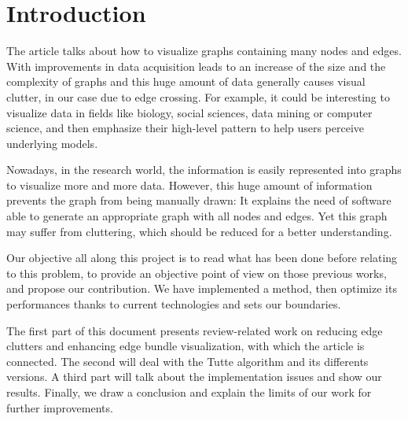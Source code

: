\chapter*{Introduction}

The article talks about how to visualize graphs containing many nodes and edges. With improvements in data acquisition leads to an increase of the size and the complexity of graphs and this huge amount of data generally causes visual clutter, in our case due to edge crossing.
For example, it could be interesting to visualize data in fields like biology, social sciences, data mining or computer science, and then emphasize their high-level pattern to help users perceive underlying models.


Nowadays, in the research world, the information is easily represented into graphs to visualize more and more data. However, this huge amount of information prevents the graph from being manually drawn:  It explains the need of software able to generate an appropriate graph with all nodes and edges. Yet this graph may suffer from cluttering, which should be reduced for a better understanding.

Our objective all along this project is to read what has been done before relating to this problem, to provide an objective point of view on those previous works, and propose our contribution. We have implemented a method, then optimize its performances thanks to current technologies and sets our boundaries. 


The first part of this document presents review-related work on reducing edge clutters and enhancing edge bundle visualization, with which the article is connected. The second will deal with the Tutte algorithm and its differents versions. A third part will talk about the implementation issues and show our results. Finally, we draw a conclusion and explain the limits of our work for further improvements.

